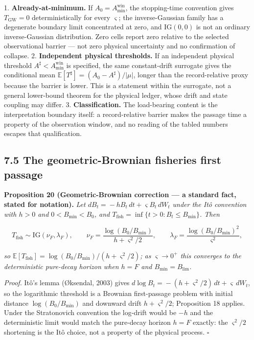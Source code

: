 \documentclass[11pt]{article}
\begin{document}
1. \textbf{Already-at-minimum.} If \(A_0 = A_{\min}^{\mathrm{win}}\), the stopping-time convention gives \(T_{\mathrm{GW}} = 0\) deterministically for every \(\varsigma\); the inverse-Gaussian family has a degenerate boundary limit concentrated at zero, and \(\mathrm{IG}(0,0)\) is not an ordinary inverse-Gaussian distribution. Zero cells report zero relative to the selected observational barrier --- not zero physical uncertainty and no confirmation of collapse. 2. \textbf{Independent physical thresholds.} If an independent physical threshold \(A^\sharp < A_{\min}^{\mathrm{win}}\) is specified, the same constant-drift surrogate gives the conditional mean \(\mathbb{E}[T^\sharp] =\allowbreak{} (A_0 - A^\sharp)/|\mu|\), longer than the record-relative proxy because the barrier is lower. This is a statement within the surrogate, not a general lower-bound theorem for the physical ledger, whose drift and state coupling may differ. 3. \textbf{Classification.} The load-bearing content is the interpretation boundary itself: a record-relative barrier makes the passage time a property of the observation window, and no reading of the tabled numbers escapes that qualification.

\subsection*{7.5 The geometric-Brownian fisheries first passage}\label{75-the-geometric-brownian-fisheries-first-passage}

\textbf{Proposition 20 (Geometric-Brownian correction --- a standard fact, stated for notation).} \emph{Let \(dB_t =\allowbreak{} -hB_t\,\allowbreak{} dt +\allowbreak{} \varsigma B_t\,\allowbreak{} dW_t\) under the It\^{o} convention with \(h > 0\) and \(0 < B_{\min} < B_0\), and \(T_{\mathrm{fish}} =\allowbreak{} \inf\{ t > 0 : B_t \le B_{\min} \}\). Then} 

$$T_{\mathrm{fish}} \sim \mathrm{IG}(\nu_F, \lambda_F), \qquad \nu_F = \frac{\log(B_0/\allowbreak{}B_{\min})}{h + \varsigma^2/\allowbreak{}2}, \qquad \lambda_F = \frac{\log(B_0/\allowbreak{}B_{\min})^2}{\varsigma^2},$$

 \emph{so \(\mathbb{E}[T_{\mathrm{fish}}] =\allowbreak{} \log(B_0/\allowbreak{}B_{\min})/(h +\allowbreak{} \varsigma^2/\allowbreak{}2)\); as \(\varsigma \to 0^+\) this converges to the deterministic pure-decay horizon when \(h = F\) and \(B_{\min} = B_{\lim}\).}

\emph{Proof.} It\^{o}'s lemma (\O{}ksendal, 2003) gives \(d\log B_t =\allowbreak{} -(h +\allowbreak{} \varsigma^2/\allowbreak{}2)\,\allowbreak{} dt +\allowbreak{} \varsigma\,\allowbreak{} dW_t\), so the logarithmic threshold is a Brownian first-passage problem with initial distance \(\log(B_0/\allowbreak{}B_{\min})\) and downward drift \(h +\allowbreak{} \varsigma^2/\allowbreak{}2\); Proposition 18 applies. Under the Stratonovich convention the log-drift would be \(-h\) and the deterministic limit would match the pure-decay horizon \(h = F\) exactly: the \(\varsigma^2/\allowbreak{}2\) shortening is the It\^{o} choice, not a property of the physical process. \(\square\)
\end{document}
